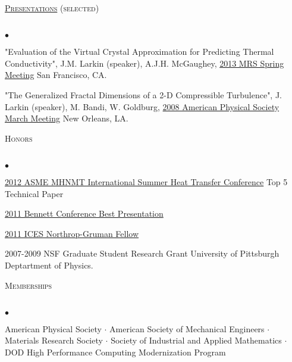 \documentclass{article}
\newcommand{\lineunder}{\vspace*{-8pt} \\ \hspace*{-18pt} \hrulefill \\}
\newcommand{\header}[1]{{\hspace*{-15pt}\vspace*{6pt} \textsc{#1}} \vspace*{-6pt} \lineunder}
\newenvironment{achievements}{\begin{list}{$\bullet$}{\topsep 0pt \itemsep -2pt}}{\vspace*{4pt}\end{list}}
\begin{document}
\header{\href{http://jasonlarkin.github.io/pres.html}{Presentations} (selected)}
\begin{achievements}
\item "Evaluation of the Virtual Crystal Approximation for Predicting Thermal Conductivity", J.M. Larkin (speaker), A.J.H.
   McGaughey, \href{http://www.mrs.org/spring2013/}{2013 MRS Spring Meeting} San Francisco, CA.
\item "The Generalized Fractal Dimensions of a 2-D Compressible Turbulence", J. Larkin (speaker), M. Bandi, W. Goldburg, \href{http://meetings.aps.org/Meeting/MAR08/Content/1017}{2008 American Physical Society March Meeting} New Orleans, LA.
\end{achievements}


\header{Honors}
\begin{achievements}
\item \href{http://www.asmeconferences.org/HT2012/}{2012 ASME MHNMT International Summer Heat Transfer Conference} Top 5 Technical Paper
\item \href{http://www.cmu.edu/me/news/archive/2011/bennett-conference.html}{2011 Bennett Conference Best Presentation}
\item \href{http://www.ices.cmu.edu/newsitem.asp?NewsID=749}{2011 ICES Northrop-Gruman Fellow}
\item 2007-2009 NSF Graduate Student Research Grant University of Pittsburgh Deptartment of Physics.
\end{achievements}

\header{Memberships}
\begin{achievements}
\item American Physical Society $\cdot$ American Society of Mechanical Engineers 
$\cdot$ Materials Research Society $\cdot$ Society of Industrial and Applied Mathematics $\cdot$ DOD High Performance Computing Modernization Program
\end{achievements}
\end{document}
